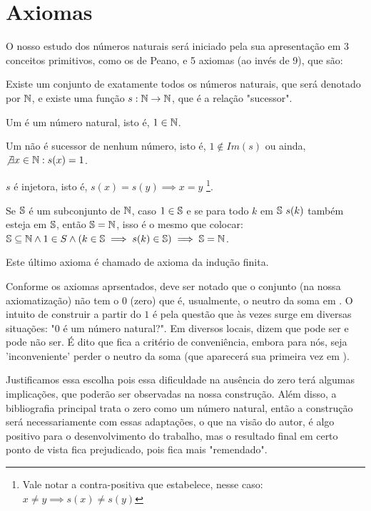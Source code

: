 \documentclass[../main.tex]{subfiles}
\begin{document}
\section{Axiomas}
O nosso estudo dos números naturais será iniciado pela sua apresentação em 3 conceitos primitivos, como os de Peano, e 5 axiomas (ao invés de 9), que são:

\begin{axi}\label{axi-existe-n-s}
    Existe um conjunto de exatamente todos os números naturais, que será denotado por $\N$, e existe uma função $s: \N \rightarrow \N$, que é a relação "sucessor". 
\end{axi} %
\begin{axi}\label{axi-um-natural}
    Um é um número natural, isto é, $1 \in \N$.
\end{axi}
\begin{axi}\label{axi-um-nao-sucessor}
    Um não é sucessor de nenhum número, isto é, $1 \not \in Im(s)$ ou ainda, $\not \exists x \in \N : s(x) = 1$.
\end{axi}
\begin{axi}\label{axi-s-injetora}
    $s$ é injetora, isto é, $s(x) = s(y) \implies x = y$ \footnote{Vale notar a contra-positiva que estabelece, nesse caso: $x \neq y \implies s(x) \neq s(y)$}.
\end{axi}
\begin{axi}\label{axi-ind-finita}
    Se $\S$ é um subconjunto de $\N$, caso $1 \in \S$ e se para todo $k$ em $\S\ s(k)$ também esteja em $\S$, então $\S = \N$, isso é o mesmo que colocar:
     $\S \subseteq \N \land 1 \in S \land ( k \in \S \implies s(k) \in \S) \implies \S = \N$.
\end{axi}
Este último axioma é chamado de axioma da indução finita.

Conforme os axiomas aprsentados, deve ser notado que o conjunto \N (na nossa axiomatização) não tem o $0$ (zero) que é, usualmente, o neutro da soma em \N. O intuito de construir a partir do $1$ é pela questão que às vezes surge em diversas situações: "$0$ é um número natural?". Em diversos locais, dizem que pode ser e pode não ser. É dito que fica a critério de conveniência, embora para nós, seja 'inconveniente' perder o neutro da soma (que aparecerá sua primeira vez em \Z). 

Justificamos essa escolha pois essa dificuldade na ausência do zero terá algumas implicações, que poderão ser observadas na nossa construção. Além disso, a bibliografia principal trata o zero como um número natural, então a construção será necessariamente com essas adaptações, o que na visão do autor, é algo positivo para o desenvolvimento do trabalho, mas o resultado final em certo ponto de vista fica prejudicado, pois fica mais "remendado".
\end{document}
